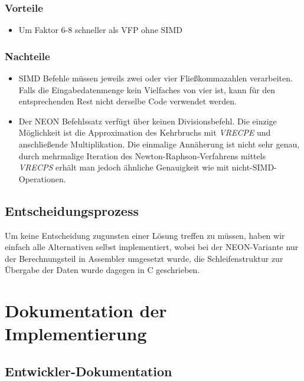 \documentclass[11pt]{scrartcl}
\begin{document}
\subsubsection*{Vorteile}
\begin{itemize}
\item Um Faktor 6-8 schneller als VFP ohne SIMD
\end{itemize}
\subsubsection*{Nachteile}
\begin{itemize}
\item SIMD Befehle müssen jeweils zwei oder vier Fließkommazahlen verarbeiten. Falls die Eingabedatenmenge kein Vielfaches von vier ist, kann für den entsprechenden Rest nicht derselbe Code verwendet werden.
\item Der NEON Befehlssatz verfügt über keinen Divisionsbefehl. Die einzige Möglichkeit ist die Approximation des Kehrbruchs mit \emph{VRECPE} und anschließende Multiplikation.
Die einmalige Annäherung ist nicht sehr genau, durch mehrmalige Iteration des Newton-Raphson-Verfahrens mittels \emph{VRECPS} erhält man jedoch ähnliche Genauigkeit wie mit nicht-SIMD-Operationen.
\end{itemize}
\subsection{Entscheidungsprozess}
Um keine Entscheidung zugunsten einer Lösung treffen zu müssen, haben wir einfach alle Alternativen selbst implementiert, wobei bei der NEON-Variante nur der Berechnungsteil in Assembler umgesetzt wurde, die Schleifenstruktur zur Übergabe der Daten wurde dagegen in C geschrieben.
\section{Dokumentation der Implementierung}
\subsection{Entwickler-Dokumentation}
\end{document}

